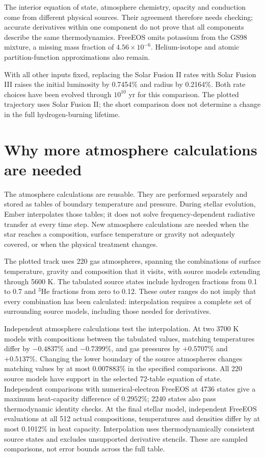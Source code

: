 \documentclass[11pt,letterpaper]{article}
\begin{document}
The interior equation of state, atmosphere chemistry, opacity and conduction
come from different physical sources. Their agreement therefore needs checking;
accurate derivatives within one component do not prove that all components
describe the same thermodynamics. FreeEOS omits potassium from the GS98 mixture,
a missing mass fraction of $4.56\times10^{-6}$. Helium-isotope and atomic
partition-function approximations also remain.

With all other inputs fixed, replacing the Solar Fusion II rates with
Solar Fusion III \cite{acharya25} raises the initial luminosity by 0.7454\%
and radius by 0.2164\%. Both rate choices have been evolved through
$10^{10}$ yr for this comparison. The plotted trajectory uses Solar Fusion II;
the short comparison does not determine a change in the full hydrogen-burning
lifetime.

\section{Why more atmosphere calculations are needed}
The atmosphere calculations are reusable. They are performed
separately and stored as tables of boundary temperature and pressure. During
stellar evolution, Ember interpolates those tables; it does not solve
frequency-dependent radiative transfer at every time step. New atmosphere
calculations are needed when the star reaches a composition, surface
temperature or gravity not adequately covered, or when the physical treatment
changes.

The plotted track uses 220 gas atmospheres, spanning the combinations of
surface temperature, gravity and composition that it visits, with source
models extending through 5600 K.
The tabulated source states include hydrogen fractions from 0.1 to 0.7 and
$^3$He fractions from zero to 0.12. These outer ranges do not imply that every
combination has been calculated: interpolation requires a complete set of
surrounding source models, including those needed for derivatives.

Independent atmosphere calculations test the interpolation. At two 3700 K
models with compositions between the tabulated values, matching temperatures
differ by $-0.4837\%$ and $-0.7399\%$, and gas pressures by $+0.5707\%$
and $+0.5137\%$. Changing the lower boundary of the source atmospheres
changes matching values by at most $0.007883\%$ in the specified comparisons.
All 220 source models have support in the selected 72-table equation of state.
Independent comparisons with numerical-electron FreeEOS at 4736 states give
a maximum heat-capacity difference of $0.2952\%$; 2240 states also pass
thermodynamic identity checks. At the final stellar model, independent
FreeEOS evaluations at all 512 actual compositions, temperatures and densities
differ by at most 0.1012\% in heat capacity. Interpolation uses thermodynamically
consistent source states and excludes unsupported derivative stencils.
These are sampled comparisons, not error bounds across the full table.
\end{document}
